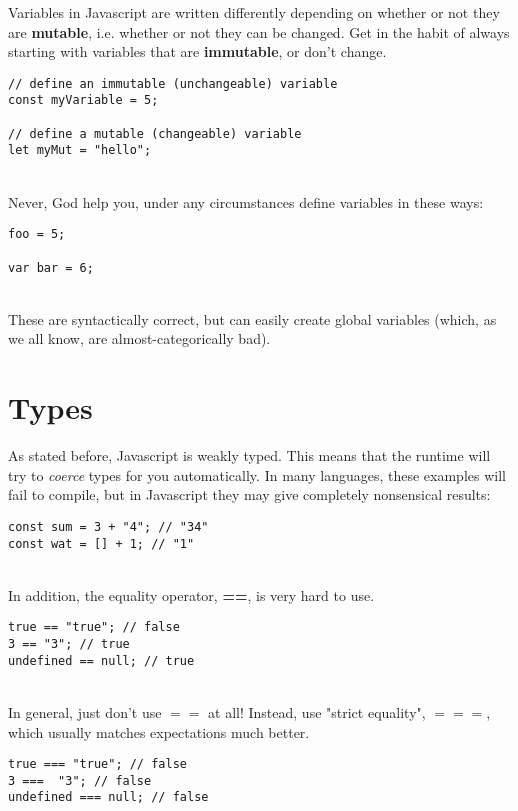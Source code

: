 \documentclass{article}
\begin{document}
Variables in Javascript are written differently depending on whether or not they are \textbf{mutable}, i.e. whether or not they can be changed. Get in the habit of always starting with variables that are \textbf{immutable}, or don't change.
\\
\begin{verbatim}
// define an immutable (unchangeable) variable
const myVariable = 5;

// define a mutable (changeable) variable
let myMut = "hello";
\end{verbatim}

\noindent
\\
Never, God help you, under any circumstances define variables in these ways:
\\
\begin{verbatim}
foo = 5;

var bar = 6;
\end{verbatim}

\noindent
\\
These are syntactically correct, but can easily create global variables (which, as we all know, are almost-categorically bad).

\section{Types}

As stated before, Javascript is weakly typed. This means that the runtime will try to \textit{coerce} types for you automatically. In many languages, these examples will fail to compile, but in Javascript they may give completely nonsensical results:

\begin{verbatim}
const sum = 3 + "4"; // "34"
const wat = [] + 1; // "1"
\end{verbatim}

\noindent
\\
In addition, the equality operator, \textbf{==}, is very hard to use.

\begin{verbatim}
true == "true"; // false
3 == "3"; // true
undefined == null; // true
\end{verbatim}

\noindent
\\
In general, just don't use $==$ at all! Instead, use "strict equality", $===$, which usually matches expectations much better.

\begin{verbatim}
true === "true"; // false
3 ===  "3"; // false
undefined === null; // false
\end{verbatim}
\end{document}
